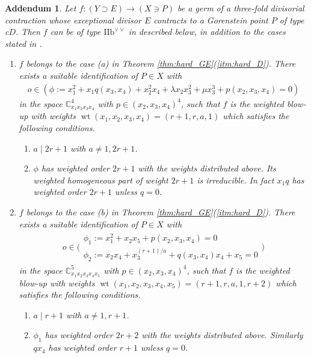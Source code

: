 \documentclass[a4paper,11pt]{amsart}
\newtheorem*{addendum}{Addendum}
\theoremstyle{definition}
\theoremstyle{remark}
\numberwithin{equation}{section}
\newcommand{\bC}{{\mathbb C}}
\newcommand{\wt}{\operatorname{wt}}
\begin{document}
\begin{addendum}
Let $f \colon (Y \supset E) \to (X \ni P)$
be a germ of a three-fold divisorial contraction
whose exceptional divisor $E$ contracts to a Gorenstein point $P$ of type c$D$.
Then $f$ can be of type ${\textrm{IIb}}^{\vee\vee}$ in \cite[Theorem 1.4]{Ka03}
described below,
in addition to the cases stated in \cite[Theorem 1.8, Corollary 1.15]{Ka03}.
\begin{enumerate}
\item\label{itm:D_1}
$f$ belongs to the case \textup{(a)}
in Theorem \textup{\ref{thm:hard_GE}(\ref{itm:hard_D})}.
There exists a suitable identification of $P \in X$ with
\begin{align*}
o \in (\phi:=x_1^2+x_1q(x_3,x_4)+x_2^2x_4+
\lambda x_2x_3^2+\mu x_3^3+p(x_2,x_3,x_4)=0)
\end{align*}
in the space $\bC^4_{x_1x_2x_3x_4}$ with $p \in (x_2,x_3,x_4)^4$,
such that $f$ is the weighted blow-up with weights
$\wt(x_1,x_2,x_3,x_4)=(r+1,r,a,1)$
which satisfies the following conditions.
\begin{enumerate}
\item
$a \mid 2r+1$ with $a\neq1,2r+1$.
\item
$\phi$ has weighted order $2r+1$ with the weights distributed above.
Its weighted homogeneous part of weight $2r+1$ is irreducible.
In fact $x_1q$ has weighted order $2r+1$ unless $q=0$.
\end{enumerate}
\item\label{itm:D_2}
$f$ belongs to the case \textup{(b)}
in Theorem \textup{\ref{thm:hard_GE}(\ref{itm:hard_D})}.
There exists a suitable identification of $P \in X$ with
\begin{align*}
o \in \bigg(
\begin{array}{c}
\phi_1:=x_1^2+x_2x_5+p(x_2,x_3,x_4)=0 \\
\phi_2:=x_2x_4+x_3^{(r+1)/a}+q(x_3,x_4)x_4+x_5=0
\end{array}
\bigg)
\end{align*}
in the space $\bC^5_{x_1x_2x_3x_4x_5}$ with $p \in (x_2,x_3,x_4)^4$,
such that $f$ is the weighted blow-up with weights
$\wt(x_1,x_2,x_3,x_4,x_5)=(r+1,r,a,1,r+2)$
which satisfies the following conditions.
\begin{enumerate}
\item
$a \mid r+1$ with $a\neq1,r+1$.
\item
$\phi_1$ has weighted order $2r+2$ with the weights distributed above.
Similarly $qx_4$ has weighted order $r+1$ unless $q=0$.
\end{enumerate}
\end{enumerate}
\end{addendum}
\end{document}
